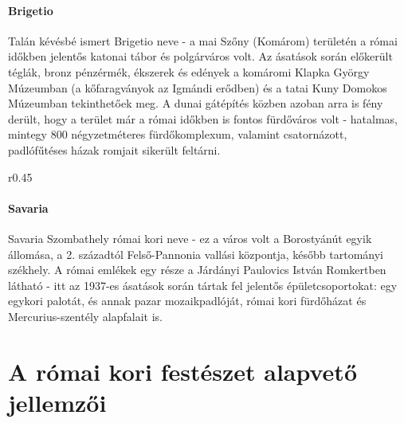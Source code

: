 \paragraph{Brigetio}
Talán kévésbé ismert Brigetio neve - a mai Szőny (Komárom) területén a római időkben jelentős katonai tábor és polgárváros volt. Az ásatások során előkerült téglák, bronz pénzérmék, ékszerek és edények a komáromi Klapka György Múzeumban (a kőfaragványok az Igmándi erődben) és a tatai Kuny Domokos Múzeumban tekinthetőek meg. A dunai gátépítés közben azoban arra is fény derült, hogy a terület már a római időkben is fontos fürdőváros volt - hatalmas, mintegy 800 négyzetméteres fürdőkomplexum, valamint csatornázott, padlófűtéses házak romjait sikerült feltárni.

\begin{wrapfigure}{r}{0.45\textwidth}
\end{wrapfigure}

\paragraph{Savaria}
Savaria Szombathely római kori neve - ez a város volt a Borostyánút egyik állomása, a 2. századtól Felső-Pannonia vallási központja, később tartományi székhely. A római emlékek egy része a Járdányi Paulovics István Romkertben látható - itt az 1937-es ásatások során tártak fel jelentős épületcsoportokat: egy egykori palotát, és annak pazar mozaikpadlóját, római kori fürdőházat és Mercurius-szentély alapfalait is.


\clearpage

\section{A római kori festészet alapvető jellemzői}


